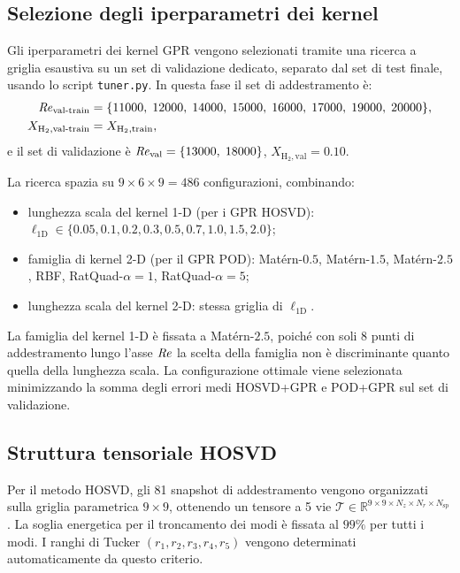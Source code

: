\subsection{Selezione degli iperparametri dei kernel}

Gli iperparametri dei kernel GPR vengono selezionati tramite una ricerca a griglia esaustiva su un set di validazione dedicato, separato dal set di test finale, usando lo script \texttt{tuner.py}. In questa fase il set di addestramento è:
\begin{align}
    \mathit{Re}_{\mathrm{val\text{-}train}} &= \{11000,\;12000,\;14000,\;15000,\;16000,\;17000,\;19000,\;20000\},\\
    X_{\mathrm{H_2,val\text{-}train}} &= X_{\mathrm{H_2,train}},
\end{align}
e il set di validazione è $\mathit{Re}_{\mathrm{val}} = \{13000,\;18000\}$, $X_{\mathrm{H_2,val}} = 0.10$.

La ricerca spazia su $9 \times 6 \times 9 = 486$ configurazioni, combinando:
\begin{itemize}
    \item lunghezza scala del kernel 1-D (per i GPR HOSVD): $\ell_{\mathrm{1D}} \in \{0.05, 0.1, 0.2, 0.3, 0.5, 0.7, 1.0, 1.5, 2.0\}$;
    \item famiglia di kernel 2-D (per il GPR POD): Matérn-$0.5$, Matérn-$1.5$, Matérn-$2.5$, RBF, RatQuad-$\alpha=1$, RatQuad-$\alpha=5$;
    \item lunghezza scala del kernel 2-D: stessa griglia di $\ell_{\mathrm{1D}}$.
\end{itemize}
La famiglia del kernel 1-D è fissata a Matérn-$2.5$, poiché con soli 8 punti di addestramento lungo l'asse $\mathit{Re}$ la scelta della famiglia non è discriminante quanto quella della lunghezza scala. La configurazione ottimale viene selezionata minimizzando la somma degli errori medi HOSVD+GPR e POD+GPR sul set di validazione.

\subsection{Struttura tensoriale HOSVD}

Per il metodo HOSVD, gli 81 snapshot di addestramento vengono organizzati sulla griglia parametrica $9\times9$, ottenendo un tensore a 5 vie $\mathcal{T} \in \mathbb{R}^{9 \times 9 \times N_z \times N_r \times N_{\mathrm{sp}}}$. La soglia energetica per il troncamento dei modi è fissata al $99\%$ per tutti i modi. I ranghi di Tucker $(r_1, r_2, r_3, r_4, r_5)$ vengono determinati automaticamente da questo criterio.

